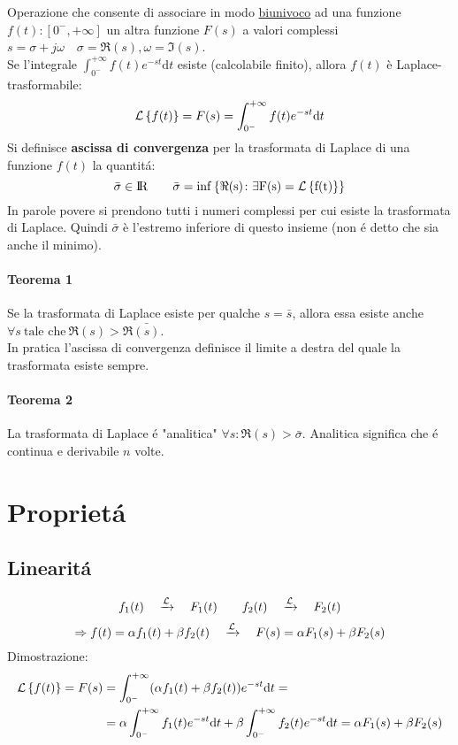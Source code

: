 \documentclass[../main.tex]{subfiles}
\begin{document}
	\label{sec:traformata_laplace}
	Operazione che consente di associare in modo \underline{biunivoco} ad una funzione $ f(t):\left[ 0^{-}, + \infty \right] $ un altra funzione $F(s)$ a valori complessi $ s = \sigma + j\omega \quad \sigma=\Re(s), \omega=\Im(s)$.\\
	\linebreak
	Se l'integrale $ \int_{0^{-}}^{+\infty}f(t)e^{-st} \mathrm{d}t $ esiste (calcolabile finito), allora $f(t)$ è Laplace-trasformabile:
	$$ \mathcal{L} \left\lbrace f(t) \right\rbrace = F(s) = \int_{0^{-}}^{+\infty} f(t) e^{- s t} \mathrm{d} t $$
	\linebreak
	Si definisce \textbf{ascissa di convergenza} per la trasformata di Laplace di una funzione $f(t)$ la quantit\'a:\\
	$$ \bar{\sigma} \in \rm I\!R \qquad \bar{\sigma} = inf\left\lbrace \Re{(s)} \colon \exists F(s) = \mathcal{L} \left\lbrace f(t) \right\rbrace \right\rbrace $$
	In parole povere si prendono tutti i numeri complessi per cui esiste la trasformata di Laplace. Quindi $ \bar{\sigma} $ è l'estremo inferiore di questo insieme (non \'e detto che sia anche il minimo).
	\paragraph{Teorema 1} Se la trasformata di Laplace esiste per qualche $s=\bar{s}$, allora essa esiste anche $ \forall s\ \text{tale che}\ \Re{(s)} > \Re{\bar{(s)}} $.\\
	In pratica l'ascissa di convergenza definisce il limite a destra del quale la trasformata esiste sempre.
	\paragraph{Teorema 2} La trasformata di Laplace \'{e} "analitica" $ \forall s \colon \Re{(s)} > \bar{\sigma}$. Analitica significa che \'e continua e derivabile $n$ volte.
	\section{Propriet\'{a}}
	\subsection{Linearit\'{a}}
	\label{linear}
	$$ f_{1}(t) \quad \xrightarrow{\mathcal{L}} \quad F_{1}(t) \qquad f_{2}(t) \quad \xrightarrow{\mathcal{L}} \quad F_{2}(t) $$
	$$ \Rightarrow f(t)=\alpha f_{1}(t) + \beta f_{2}(t) \quad \xrightarrow{\mathcal{L}} \quad F(s)=\alpha F_{1}(s) + \beta F_{2}(s) $$
	Dimostrazione:
	\begin{align*}
		\mathcal{L} \left\lbrace f(t) \right\rbrace = F(s) &= \int_{0^{-}}^{+\infty} (\alpha f_{1}(t) + \beta f_{2}(t)) e^{- s t} \mathrm{d} t =\\
		&= \alpha \int_{0^{-}}^{+\infty} f_{1}(t) e^{- s t} \mathrm{d} t + \beta \int_{0^{-}}^{+\infty} f_{2}(t) e^{- s t} \mathrm{d} t = \alpha F_{1}(s) + \beta F_{2}(s)
	\end{align*}
\end{document}
